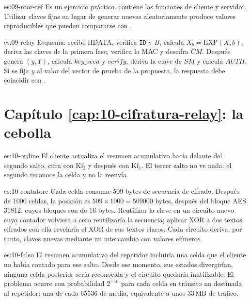 \begin{soluzione}{es:09-ntor-ref}
Es un ejercicio práctico.  contiene las funciones de cliente y servidor. Utilizar claves fijas en lugar de generar nuevas aleatoriamente produce valores reproducibles que pueden compararse con .
\end{soluzione}

\begin{soluzione}{es:09-relay}
Esquema:  recibe HDATA, verifica \texttt{ID} y $B$, calcula $X_b=\mathrm{EXP}(X,b)$, deriva las claves de la primera fase, verifica la MAC y descifra $CM$. Después  genera $(y,Y)$, calcula $\mathit{key\_seed}$ y $\mathit{verify}$, deriva la clave de $SM$ y calcula $\mathit{AUTH}$. Si se fija $y$ al valor del vector de prueba de la propuesta, la respuesta debe coincidir con .
\end{soluzione}

\section*{Capítulo \ref{cap:10-cifratura-relay}: la cebolla}

\begin{soluzione}{es:10-ordine}
El cliente actualiza el resumen acumulativo hacia delante del segundo salto, cifra con Kf$_2$ y después con Kf$_1$. El tercer salto no ve nada: el segundo reconoce la celda y no la reenvía.
\end{soluzione}

\begin{soluzione}{es:10-contatore}
Cada celda consume 509 bytes de secuencia de cifrado. Después de \num{1000} celdas, la posición es $509\times1000=\num{509000}$ bytes, después del bloque AES \num{31812}, cuyos bloques son de 16 bytes. Reutilizar la clave en un circuito nuevo cuyo contador volviera a cero reutilizaría la secuencia; aplicar XOR a dos textos cifrados con ella revelaría el XOR de sus textos claros. Cada circuito deriva, por tanto, claves nuevas mediante un intercambio con valores efímeros.
\end{soluzione}

\begin{soluzione}{es:10-falso}
El resumen acumulativo del repetidor incluiría una celda que el cliente no había contado para ese salto. Desde ese momento, sus estados divergirían, ninguna celda posterior sería reconocida y el circuito quedaría inutilizable. El problema ocurre con probabilidad $2^{-16}$ para cada celda en tránsito no destinada al repetidor: una de cada \num{65536} de media, equivalente a unos 33\,MB de tráfico.
\end{soluzione}

